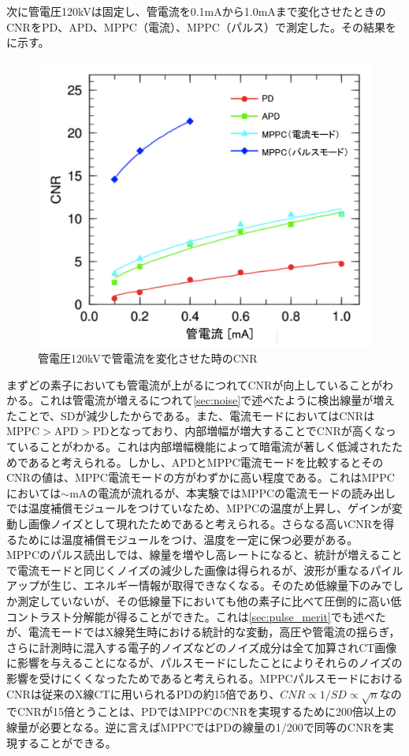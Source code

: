 次に管電圧120kVは固定し、管電流を0.1mAから1.0mAまで変化させたときのCNRをPD、APD、MPPC（電流）、MPPC（パルス）で測定した。その結果をに示す。



\begin{figure}[H]
 \begin{center}
 \includegraphics[bb=0.000000 0.000000 630.667865 539.955364,width=0.7\hsize]{image2/chapter5/cnr_current.png} 
 \end{center}
 \caption{管電圧120kVで管電流を変化させた時のCNR}
 \label{fig:cnr_current}
\end{figure}


まずどの素子においても管電流が上がるにつれてCNRが向上していることがわかる。これは管電流が増えるにつれて\ref{sec:noise}で述べたように検出線量が増えたことで、SDが減少したからである。また、電流モードにおいてはCNRはMPPC$>$APD$>$PDとなっており、内部増幅が増大することでCNRが高くなっていることがわかる。これは内部増幅機能によって暗電流が著しく低減されたためであると考えられる。しかし、APDとMPPC電流モードを比較するとそのCNRの値は、MPPC電流モードの方がわずかに高い程度である。これはMPPCにおいては$\sim$mAの電流が流れるが、本実験ではMPPCの電流モードの読み出しでは温度補償モジュールをつけていなため、MPPCの温度が上昇し、ゲインが変動し画像ノイズとして現れたためであると考えられる。さらなる高いCNRを得るためには温度補償モジュールをつけ、温度を一定に保つ必要がある。\\
MPPCのパルス読出しでは、線量を増やし高レートになると、統計が増えることで電流モードと同じくノイズの減少した画像は得られるが、波形が重なるパイルアップが生じ、エネルギー情報が取得できなくなる。そのため低線量下のみでしか測定していないが、その低線量下においても他の素子に比べて圧倒的に高い低コントラスト分解能が得ることができた。これは\ref{sec:pulse_merit}でも述べたが、電流モードではX線発生時における統計的な変動，高圧や管電流の揺らぎ，さらに計測時に混入する電子的ノイズなどのノイズ成分は全て加算されCT画像に影響を与えることになるが、パルスモードにしたことによりそれらのノイズの影響を受けにくくなったためであると考えられる。MPPCパルスモードにおけるCNRは従来のX線CTに用いられるPDの約15倍であり、$CNR\propto 1/SD\propto\sqrt{n} $なのでCNRが15倍とうことは、PDではMPPCのCNRを実現するために200倍以上の線量が必要となる。逆に言えばMPPCではPDの線量の1/200で同等のCNRを実現することができる。

